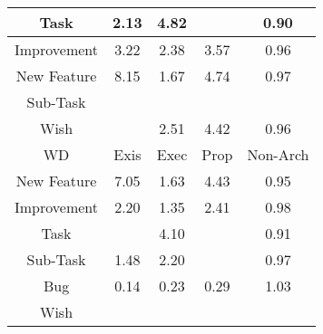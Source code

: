 \begin{tabular}{|c||c|c|c|c|}
\hline
Task & \cellcolor[rgb]{0.8700157476954358,0.8210600910136274,0.42} 2.13 & \cellcolor[rgb]{0.7749425429253993,0.776025415069926,0.42} 4.82 &  & \cellcolor[rgb]{0.8941087879398946,0.7647815962488341,0.4051682020772349} 0.90 \\ 
\hline
Improvement & \cellcolor[rgb]{0.8315437553256143,0.8028365156805541,0.42} 3.22 & \cellcolor[rgb]{0.8611761055263292,0.816872892091419,0.42} 2.38 & \cellcolor[rgb]{0.8191467433982904,0.7969642468728744,0.42} 3.57 & \cellcolor[rgb]{0.9031747973051567,0.8076940405777416,0.41362981081814626} 0.96 \\ 
\hline
New Feature & \cellcolor[rgb]{0.6572474524201206,0.7202751090411097,0.42} 8.15 & \cellcolor[rgb]{0.8863291425061054,0.8287874885555235,0.42} 1.67 & \cellcolor[rgb]{0.7777037992782727,0.7773333786054976,0.42} 4.74 & \cellcolor[rgb]{0.9042761769360372,0.8129072374972427,0.4146577651403014} 0.97 \\ 
\hline
Sub-Task &  &  &  &  \\ 
\hline
Wish &  & \cellcolor[rgb]{0.85651265813752,0.8146638906967199,0.41999999999999993} 2.51 & \cellcolor[rgb]{0.7890465312206311,0.7827062516308252,0.42} 4.42 & \cellcolor[rgb]{0.9031350051352239,0.8075056909733931,0.4135926714595423} 0.96 \\ 
\hline
\hline
WD & Exis & Exec & Prop & Non-Arch \\ 
\hline
New Feature & \cellcolor[rgb]{0.6960888186772449,0.7386736509523792,0.42} 7.05 & \cellcolor[rgb]{0.8877873038000205,0.8294781965368518,0.42} 1.63 & \cellcolor[rgb]{0.7888071597190597,0.7825928651300809,0.42} 4.43 & \cellcolor[rgb]{0.9013875144251984,0.7992342349459389,0.41196168013018514} 0.95 \\ 
\hline
Improvement & \cellcolor[rgb]{0.8676127593001479,0.8199218333527016,0.42} 2.20 & \cellcolor[rgb]{0.8977453295202942,0.8341951560885603,0.42} 1.35 & \cellcolor[rgb]{0.8601546087130463,0.816389025179864,0.42000000000000004} 2.41 & \cellcolor[rgb]{0.9069837375529635,0.8257230244173602,0.4171848217160992} 0.98 \\ 
\hline
Task &  & \cellcolor[rgb]{0.8004012905417088,0.7880848218355463,0.42} 4.10 &  & \cellcolor[rgb]{0.8955021514685637,0.7713768502845344,0.40646867470399267} 0.91 \\ 
\hline
Sub-Task & \cellcolor[rgb]{0.8928905252391367,0.8318955119553805,0.42} 1.48 & \cellcolor[rgb]{0.8676038659123532,0.819917620695325,0.42} 2.20 &  & \cellcolor[rgb]{0.9042111815997304,0.8125995929053903,0.414597102826415} 0.97 \\ 
\hline
Bug & \cellcolor[rgb]{0.7658517010007121,0.15769805140337034,0.2854615876006646} 0.14 & \cellcolor[rgb]{0.780962917714837,0.2292244771835617,0.2995653898671812} 0.23 & \cellcolor[rgb]{0.7909765488357846,0.27662233115604695,0.3089114455800656} 0.29 & \cellcolor[rgb]{0.9090469823363696,0.8395485705803856,0.42} 1.03 \\ 
\hline
Wish &  &  &  &  \\ 
\hline
\end{tabular}